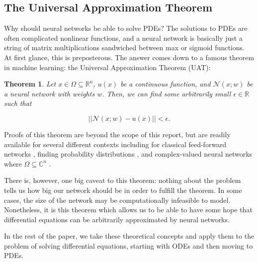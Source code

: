 \documentclass{CUP-JNL-DTM}%
\newtheorem{theorem}{Theorem}[section]
\theoremstyle{definition}
\numberwithin{equation}{section}
\newcommand{\net}{\mathcal{N}}
\begin{document}

\subsection{The Universal Approximation Theorem}

Why should neural networks be able to solve PDEs? The solutions to PDEs are often complicated nonlinear functions, and a neural network is basically just a string of matrix multiplications sandwiched between max or sigmoid functions. At first glance, this is preposterous. The answer comes down to a famous theorem in machine learning: the Universal Approximation Theorem (UAT):

\begin{theorem}

Let $x \in \Omega \subseteq \mathbb{R}^n$, $u(x)$ be a continuous function, and $\net(x;w)$ be a neural network with weights $w$. Then, we can find some arbitrarily small $\epsilon \in \mathbb{R}$ such that 

\begin{equation}
	||\net(x;w) - u(x)|| < \epsilon. 
\end{equation}

\end{theorem}

\noindent Proofs of this theorem are beyond the scope of this report, but are readily available for several different contexts including for classical feed-forward networks \cite{hornikMultilayerFeedforwardNetworks1989, hornikApproximationCapabilitiesMultilayer1991}, finding probability distributions \cite{luUniversalApproximationTheorem2020}, and complex-valued neural networks where $\Omega \subseteq \mathbb{C}^n$ \cite{voigtlaenderUniversalApproximationTheorem2020}. 

There is, however, one big caveat to this theorem: nothing about the problem tells us how big our network should be in order to fulfill the theorem. In some cases, the size of the network may be computationally infeasible to model. Nonetheless, it is this theorem which allows us to be able to have some hope that differential equations can be arbitrarily approximated by neural networks. 

In the rest of the paper, we take these theoretical concepts and apply them to the problem of solving differential equations, starting with ODEs and then moving to PDEs. 

\end{document}
